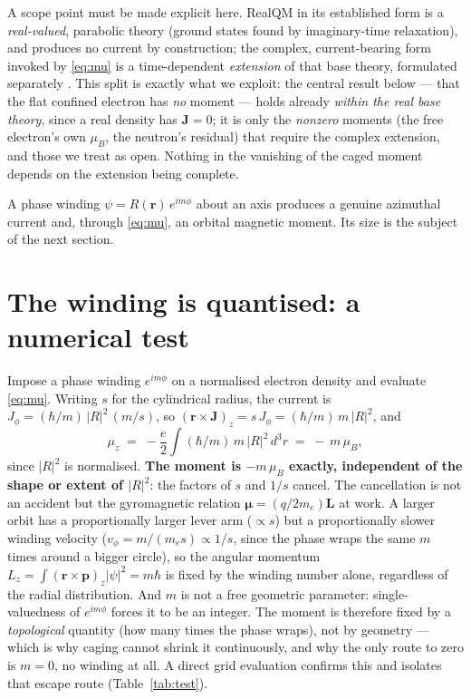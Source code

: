 \documentclass[11pt]{article}
\begin{document}
A scope point must be made explicit here. RealQM in its established form is a \emph{real-valued},
parabolic theory (ground states found by imaginary-time relaxation), and produces no current by
construction; the complex, current-bearing form invoked by \eqref{eq:mu} is a time-dependent
\emph{extension} of that base theory, formulated separately \cite{ComplexRealQM}. This split is exactly
what we exploit: the central result below --- that the flat confined electron has \emph{no} moment ---
holds already \emph{within the real base theory}, since a real density has $\mathbf J=0$; it is only the
\emph{nonzero} moments (the free electron's own $\mu_B$, the neutron's residual) that require the complex
extension, and those we treat as open. Nothing in the vanishing of the caged moment depends on the
extension being complete.

A phase winding $\psi = R(\mathbf r)\,e^{im\phi}$ about an axis produces a genuine azimuthal current and,
through \eqref{eq:mu}, an orbital magnetic moment. Its size is the subject of the next section.

\section{The winding is quantised: a numerical test}
\label{sec:test}

Impose a phase winding $e^{im\phi}$ on a normalised electron density and evaluate \eqref{eq:mu}. Writing
$s$ for the cylindrical radius, the current is $J_\phi = (\hbar/m)\,|R|^2\,(m/s)$, so
$(\mathbf r\times\mathbf J)_z = s\,J_\phi = (\hbar/m)\,m\,|R|^2$, and
\begin{equation}
\mu_z \;=\; -\frac{e}{2}\!\int (\hbar/m)\,m\,|R|^2\,d^3r \;=\; -\,m\,\mu_B ,
\label{eq:quantised}
\end{equation}
since $|R|^2$ is normalised. \textbf{The moment is $-m\,\mu_B$ exactly, independent of the shape or
extent of $|R|^2$}: the factors of $s$ and $1/s$ cancel. The cancellation is not an accident but the
gyromagnetic relation $\boldsymbol\mu = (q/2m_e)\mathbf L$ at work. A larger orbit has a proportionally
larger lever arm ($\propto s$) but a proportionally slower winding velocity ($v_\phi = m/(m_e s)\propto
1/s$, since the phase wraps the same $m$ times around a bigger circle), so the angular momentum
$L_z = \int (\mathbf r\times\mathbf p)_z|\psi|^2 = m\hbar$ is fixed by the winding number alone,
regardless of the radial distribution. And $m$ is not a free geometric parameter: single-valuedness of
$e^{im\phi}$ forces it to be an integer. The moment is therefore fixed by a \emph{topological} quantity
(how many times the phase wraps), not by geometry --- which is why caging cannot shrink it continuously,
and why the only route to zero is $m=0$, no winding at all. A direct grid evaluation confirms this and
isolates that escape route (Table~\ref{tab:test}).
\end{document}
